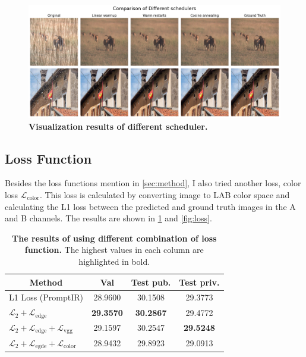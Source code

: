\documentclass[10pt,twocolumn,letterpaper]{article}
\begin{document}
\begin{figure}[h]
  \centering
  \includegraphics[width=1\linewidth]{assets/exp-scheduler.png}
  \caption{\textbf{Visualization results of different scheduler.}}
  \label{fig:scheduler}
\end{figure}

\subsection*{Loss Function}

Besides the loss functions mention in \cref{sec:method}, I also tried another loss,
color loss $\mathcal{L}_{\text{color}}$. This loss is calculated by converting
image to LAB color space and calculating the L1 loss between the predicted and
ground truth images in the A and B channels. The results are shown in
\cref{tab:loss} and \cref{fig:loss}.

\begin{table}[h]
  \centering
  \begin{tabular}{lccc}
    \toprule
    \multicolumn{1}{c}{\textbf{Method}}   & \textbf{Val}    & \textbf{Test pub.} & \textbf{Test priv.} \\
    \midrule
    L1 Loss (PromptIR)                    & 28.9600 & 30.1508 & 29.3773 \\
    $\mathcal{L}_{2} + \mathcal{L}_{\text{edge}}$ & \textbf{29.3570} & \textbf{30.2867} & 29.4772 \\
    $\mathcal{L}_{2} + \mathcal{L}_{\text{edge}} + \mathcal{L}_{\text{vgg}}$ & 29.1597 & 30.2547 & \textbf{29.5248} \\
    $\mathcal{L}_{2} + \mathcal{L}_{\text{egde}} + \mathcal{L}_{\text{color}}$ & 28.9432 & 29.8923 & 29.0913 \\
    \bottomrule
  \end{tabular}
  \caption{\textbf{The results of using different combination of loss function.}
    The highest values in each column are highlighted in bold.}
  \label{tab:loss}
\end{table}
\end{document}
